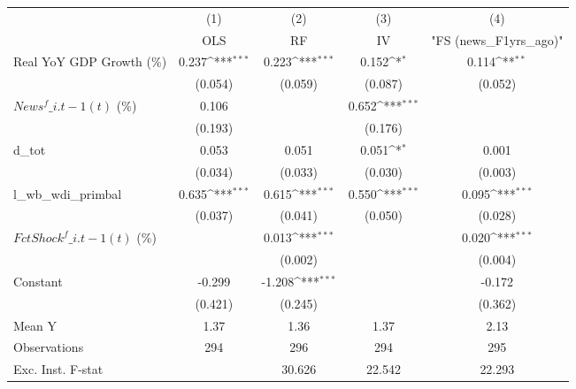 {
\def\sym#1{\ifmmode^{#1}\else\(^{#1}\)\fi}
\begin{tabular}{l*{4}{c}}
\toprule
                    &\multicolumn{1}{c}{(1)}&\multicolumn{1}{c}{(2)}&\multicolumn{1}{c}{(3)}&\multicolumn{1}{c}{(4)}\\
                    &\multicolumn{1}{c}{OLS}&\multicolumn{1}{c}{RF}&\multicolumn{1}{c}{IV}&\multicolumn{1}{c}{ "FS (news\_F1yrs\_ago)" }\\
\midrule
Real YoY GDP Growth (\%)&       0.237\sym{***}&       0.223\sym{***}&       0.152\sym{*}  &       0.114\sym{**} \\
                    &     (0.054)         &     (0.059)         &     (0.087)         &     (0.052)         \\
\addlinespace
$ News^f\_{i.t-1}(t)$ (\%)&       0.106         &                     &       0.652\sym{***}&                     \\
                    &     (0.193)         &                     &     (0.176)         &                     \\
\addlinespace
d\_tot               &       0.053         &       0.051         &       0.051\sym{*}  &       0.001         \\
                    &     (0.034)         &     (0.033)         &     (0.030)         &     (0.003)         \\
\addlinespace
l\_wb\_wdi\_primbal    &       0.635\sym{***}&       0.615\sym{***}&       0.550\sym{***}&       0.095\sym{***}\\
                    &     (0.037)         &     (0.041)         &     (0.050)         &     (0.028)         \\
\addlinespace
$ FctShock^f\_{i.t-1}(t)$ (\%)&                     &       0.013\sym{***}&                     &       0.020\sym{***}\\
                    &                     &     (0.002)         &                     &     (0.004)         \\
\addlinespace
Constant            &      -0.299         &      -1.208\sym{***}&                     &      -0.172         \\
                    &     (0.421)         &     (0.245)         &                     &     (0.362)         \\
\midrule
Mean Y              &        1.37         &        1.36         &        1.37         &        2.13         \\
Observations        &         294         &         296         &         294         &         295         \\
Exc. Inst. F-stat   &                     &      30.626         &      22.542         &      22.293         \\
\bottomrule
\end{tabular}
}
